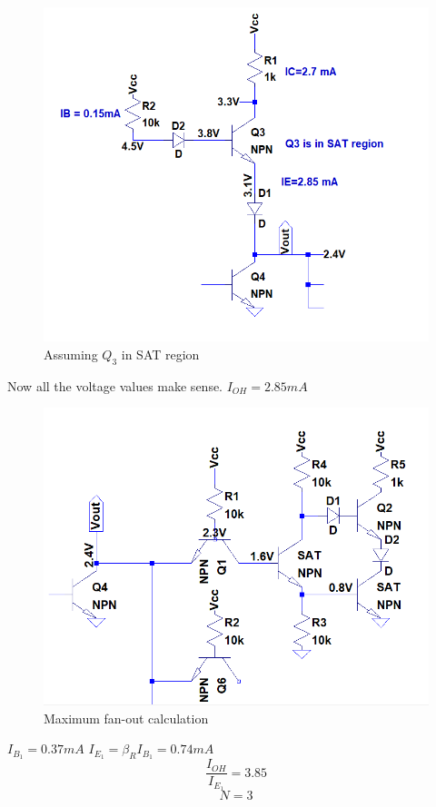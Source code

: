 \documentclass[11 pt]{article}
\begin{document}
\begin{figure}[H]
  \includegraphics[width=\linewidth]{hk}
  \caption{Assuming $Q_3$ in SAT region}
  \label{fig:zero}
\end{figure}
Now all the voltage values make sense. $I_{OH}=2.85 mA$
\begin{figure}[H]
  \includegraphics[width=\linewidth]{hi}
  \caption{Maximum fan-out calculation}
  \label{fig:zero}
\end{figure}
$I_{B_1}=0.37mA$ $I_{E_1}=\beta_R I_{B_1}=0.74 mA$
$$\frac{I_{OH}}{I_{E_1}}=3.85$$
$$N=3$$
\end{document}
